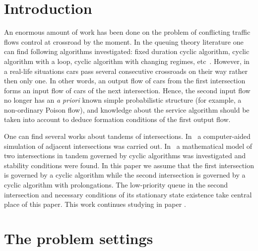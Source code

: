 \documentclass[60x84/16,10pt]{dccn}
\begin{document}
{\maketitle 


\section{Introduction}
An enormous amount of work has been done on the problem of conflicting traffic flows control at crossroad by the moment. In the queuing theory literature one can find following algorithms investigated: fixed duration cyclic algorithm, cyclic algorithm with a loop, cyclic algorithm with changing regimes, etc~\cite{n:f:p:1968,f:1977,f:1977-1,l:f:2000,p:f:2008,a:b:2010}. However, in a real-life situations cars pass several consecutive crossroads on their way rather then only one. In other words, an output flow of cars from
the first intersection forms an input flow of cars of the next intersection. Hence, the second input flow
no longer has an \textit{a priori} known simple probabilistic structure (for example, a
non-ordinary Poison flow), and knowledge about the service algorithm should be taken into account to deduce formation conditions of the first output flow.

One can find several works about tandems of intersections. In~\cite{y:l:1985} a computer-aided
simulation of adjacent intersections was carried out. In~\cite{z:2012} a mathematical model of two intersections in tandem governed by cyclic algorithms was investigated and stability conditions were found. In this paper we assume that the first intersection is governed by a cyclic algorithm while the second intersection is governed by a cyclic algorithm with prolongations. The low-priority queue in the second intersection and necessary conditions of its stationary state existence take central place of this paper. This work continues studying in paper \cite{k:z:2016}.

\section{The  problem settings}

}
\end{document}
